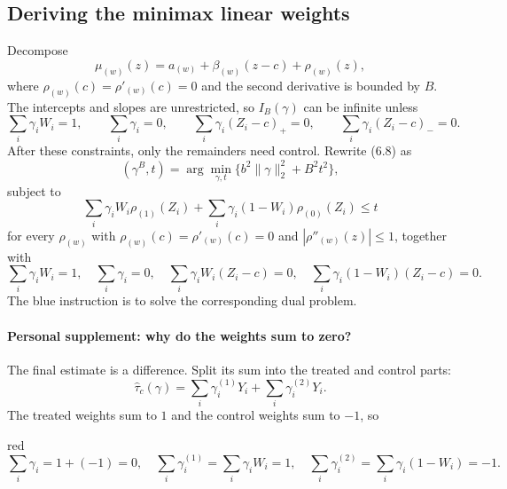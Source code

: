 \subsection{Deriving the minimax linear weights}
Decompose
\[
\mu_{(w)}(z)=a_{(w)}+\beta_{(w)}(z-c)+\rho_{(w)}(z),
\]
where $\rho_{(w)}(c)=\rho'_{(w)}(c)=0$ and the second derivative is bounded by $B$. The intercepts and slopes are unrestricted, so $I_B(\gamma)$ can be infinite unless
\[
\sum_i\gamma_iW_i=1,\qquad \sum_i\gamma_i=0,\qquad
\sum_i\gamma_i(Z_i-c)_+=0,\qquad \sum_i\gamma_i(Z_i-c)_-=0.
\]
After these constraints, only the remainders need control. Rewrite (6.8) as
\[
(\gamma^B,t)=\arg\min_{\gamma,t}\{b^2\|\gamma\|_2^2+B^2t^2\},
\]
subject to
\[
\sum_i\gamma_iW_i\rho_{(1)}(Z_i)+\sum_i\gamma_i(1-W_i)\rho_{(0)}(Z_i)\leq t
\]
for every $\rho_{(w)}$ with $\rho_{(w)}(c)=\rho'_{(w)}(c)=0$ and $|\rho''_{(w)}(z)|\leq1$, together with
\[
\sum_i\gamma_iW_i=1,\quad\sum_i\gamma_i=0,\quad
\sum_i\gamma_iW_i(Z_i-c)=0,\quad
\sum_i\gamma_i(1-W_i)(Z_i-c)=0.
\tag{6.10 in the notes}
\]
The blue instruction is to solve the corresponding dual problem.

\paragraph{Personal supplement: why do the weights sum to zero?}
The final estimate is a difference. Split its sum into the treated and control parts:
\[
\widehat\tau_c(\gamma)=\sum_i\gamma_i^{(1)}Y_i+\sum_i\gamma_i^{(2)}Y_i.
\]
The treated weights sum to $1$ and the control weights sum to $-1$, so

\begin{inkblock}{red}
\[
\sum_i\gamma_i=1+(-1)=0,\quad
\sum_i\gamma_i^{(1)}=\sum_i\gamma_iW_i=1,\quad
\sum_i\gamma_i^{(2)}=\sum_i\gamma_i(1-W_i)=-1.
\]
\end{inkblock}


